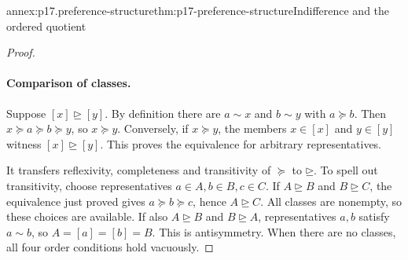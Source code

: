 \begin{annexitem}{annex:p17.preference-structure}{thm:p17-preference-structure}{Indifference and the ordered quotient}
\begin{proof}
\paragraph{Comparison of classes.}
Suppose \([x]\unrhd[y]\). By definition there are \(a\sim x\)
and \(b\sim y\) with \(a\succeq b\). Then
\(x\succeq a\succeq b\succeq y\), so \(x\succeq y\).
Conversely, if \(x\succeq y\), the members \(x\in[x]\) and
\(y\in[y]\) witness \([x]\unrhd[y]\). This proves the equivalence
for arbitrary representatives.

It transfers reflexivity, completeness and transitivity of \(\succeq\)
to \(\unrhd\). To spell out transitivity, choose representatives
\(a\in A,b\in B,c\in C\). If \(A\unrhd B\) and
\(B\unrhd C\), the equivalence just proved gives
\(a\succeq b\succeq c\), hence \(A\unrhd C\). All classes
are nonempty, so these choices are available. If also
\(A\unrhd B\) and \(B\unrhd A\), representatives \(a,b\)
satisfy \(a\sim b\), so \(A=[a]=[b]=B\). This is antisymmetry.
When there are no classes, all four order conditions hold vacuously.
\end{proof}
\end{annexitem}

